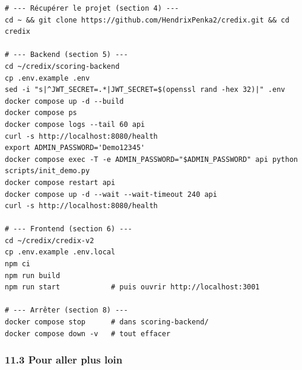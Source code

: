 \documentclass[
  french,
  11pt,
  a4paper,
]{article}
\begin{document}
\begin{Verbatim}[breaklines=true,breakanywhere=true,fontsize=\small,frame=leftline,framerule=1.6pt,rulecolor=\color{credixblue},framesep=3mm,xleftmargin=2mm,xrightmargin=1mm]
# --- Récupérer le projet (section 4) ---
cd ~ && git clone https://github.com/HendrixPenka2/credix.git && cd credix

# --- Backend (section 5) ---
cd ~/credix/scoring-backend
cp .env.example .env
sed -i "s|^JWT_SECRET=.*|JWT_SECRET=$(openssl rand -hex 32)|" .env
docker compose up -d --build
docker compose ps
docker compose logs --tail 60 api
curl -s http://localhost:8080/health
export ADMIN_PASSWORD='Demo12345'
docker compose exec -T -e ADMIN_PASSWORD="$ADMIN_PASSWORD" api python scripts/init_demo.py
docker compose restart api
docker compose up -d --wait --wait-timeout 240 api
curl -s http://localhost:8080/health

# --- Frontend (section 6) ---
cd ~/credix/credix-v2
cp .env.example .env.local
npm ci
npm run build
npm run start            # puis ouvrir http://localhost:3001

# --- Arrêter (section 8) ---
docker compose stop      # dans scoring-backend/
docker compose down -v   # tout effacer
\end{Verbatim}

\subsubsection{11.3 Pour aller plus
loin}\label{113-pour-aller-plus-loin}
\end{document}
